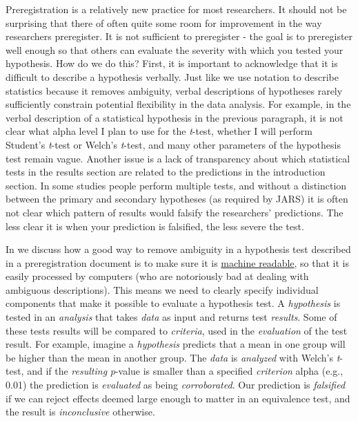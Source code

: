 \documentclass[
  oneside]{book}
\begin{document}
Preregistration is a relatively new practice for most researchers. It should not be surprising that there of often quite some room for improvement in the way researchers preregister. It is not sufficient to preregister - the goal is to preregister well enough so that others can evaluate the severity with which you tested your hypothesis. How do we do this? First, it is important to acknowledge that it is difficult to describe a hypothesis verbally. Just like we use notation to describe statistics because it removes ambiguity, verbal descriptions of hypotheses rarely sufficiently constrain potential flexibility in the data analysis. For example, in the verbal description of a statistical hypothesis in the previous paragraph, it is not clear what alpha level I plan to use for the \emph{t}-test, whether I will perform Student's \emph{t}-test or Welch's \emph{t}-test, and many other parameters of the hypothesis test remain vague. Another issue is a lack of transparency about which statistical tests in the results section are related to the predictions in the introduction section. In some studies people perform multiple tests, and without a distinction between the primary and secondary hypotheses (as required by JARS) it is often not clear which pattern of results would falsify the researchers' predictions. The less clear it is when your prediction is falsified, the less severe the test.

In \citet{lakens_improving_2020} we discuss how a good way to remove ambiguity in a hypothesis test described in a preregistration document is to make sure it is \href{https://en.wikipedia.org/wiki/Machine-readable_document}{machine readable}, so that it is easily processed by computers (who are notoriously bad at dealing with ambiguous descriptions). This means we need to clearly specify individual components that make it possible to evaluate a hypothesis test. A \emph{hypothesis} is tested in an \emph{analysis} that takes \emph{data} as input and returns test \emph{results}. Some of these tests results will be compared to \emph{criteria}, used in the \emph{evaluation} of the test result. For example, imagine a \emph{hypothesis} predicts that a mean in one group will be higher than the mean in another group. The \emph{data} is \emph{analyzed} with Welch's \emph{t}-test, and if the \emph{resulting} \emph{p}-value is smaller than a specified \emph{criterion} alpha (e.g., 0.01) the prediction is \emph{evaluated} as being \emph{corroborated}. Our prediction is \emph{falsified} if we can reject effects deemed large enough to matter in an equivalence test, and the result is \emph{inconclusive} otherwise.
\end{document}
